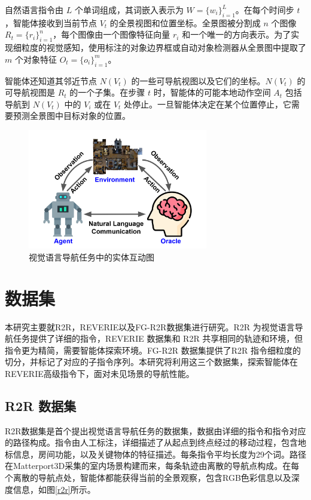 \documentclass[bachelor]{thesis-uestc}
\begin{document}
自然语言指令由 \( L \) 个单词组成，其词嵌入表示为 \( W = \{w_i\}_{i=1}^{L} \)。在每个时间步 \( t \)，智能体接收到当前节点 \( V_t \) 的全景视图和位置坐标。全景图被分割成 \( n \) 个图像 \( R_t = \{r_i\}_{i=1}^{n} \)，每个图像由一个图像特征向量 \( r_i \) 和一个唯一的方向表示。为了实现细粒度的视觉感知，使用标注的对象边界框或自动对象检测器从全景图中提取了 \( m \) 个对象特征 \( O_t = \{o_i\}_{i=1}^{m} \)。

智能体还知道其邻近节点 \( N(V_t) \) 的一些可导航视图以及它们的坐标。\( N(V_t) \) 的可导航视图是 \( R_t \) 的一个子集。在步骤 \( t \) 时，智能体的可能本地动作空间 \( A_t \) 包括导航到 \( N(V_t) \) 中的 \( V_i \) 或在 \( V_t \) 处停止。一旦智能体决定在某个位置停止，它需要预测全景图中目标对象的位置。
\begin {figure}[h]
\centering %
\includegraphics[width=0.7\textwidth]{5253-050520.png}
\caption{视觉语言导航任务中的实体互动图} %
\label{orace}
\end {figure}
\section{数据集}

本研究主要就R2R，REVERIE以及FG-R2R数据集进行研究。R2R 为视觉语言导航任务提供了详细的指令，REVERIE 数据集和 R2R 共享相同的轨迹和环境，但指令更为精简，需要智能体探索环境。FG-R2R 数据集提供了R2R 指令细粒度的切分，并标记了对应的子指令序列。本研究将利用这三个数据集，探索智能体在REVERIE高级指令下，面对未见场景的导航性能。

\subsection{R2R 数据集}
R2R数据集是首个提出视觉语言导航任务的数据集，数据由详细的指令和指令对应的路径构成。指令由人工标注，详细描述了从起点到终点经过的移动过程，包含地标信息，房间功能，以及关键物体的特征描述。每条指令平均长度为29个词。路径在Matterport3D采集的室内场景构建而来，每条轨迹由离散的导航点构成。在每个离散的导航点处，智能体都能获得当前的全景观察，包含RGB色彩信息以及深度信息，如图\ref{r2r}所示。
\end{document}
